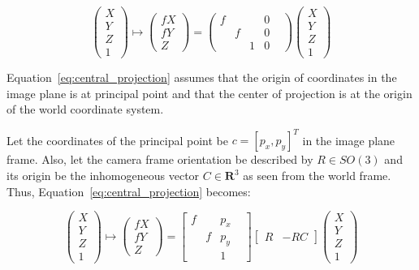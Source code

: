 \documentclass[runningheads]{llncs}
\begin{document}
\begin{equation}\label{eq:central_projection}
\begin{pmatrix}
X\\ Y\\ Z\\ 1
\end{pmatrix}
\mapsto
\begin{pmatrix}
fX\\ fY\\ Z
\end{pmatrix}
=
\begin{pmatrix}
f& & &0& \\
 &f& &0& \\
 & &1&0&
\end{pmatrix}
\begin{pmatrix}
X\\ Y\\ Z\\ 1
\end{pmatrix}
\end{equation}

Equation~\ref{eq:central_projection} assumes that the origin of coordinates in
the image plane is at principal point and that the center of
projection is at the origin of the world coordinate system.

Let the coordinates of the principal point be $c = [p_x,p_y]^T$ in the
image plane frame. Also, let the camera frame orientation be described
by $R\in SO(3)$ and its origin be the inhomogeneous vector
$C\in \mathbf{R}^3$ as seen from the world frame. Thus,
Equation~\ref{eq:central_projection} becomes:

\begin{equation}\label{eq:central_projection1}
\begin{pmatrix}
X\\ Y\\ Z\\ 1
\end{pmatrix}
\mapsto
\begin{pmatrix}
fX\\ fY\\ Z
\end{pmatrix}
=
\begin{bmatrix}
f& &p_x& \\
 &f&p_y& \\
 & &1  &
\end{bmatrix}
\begin{bmatrix}
R & -RC
\end{bmatrix}
\begin{pmatrix}
X\\ Y\\ Z\\ 1
\end{pmatrix}
\end{equation}
\end{document}

